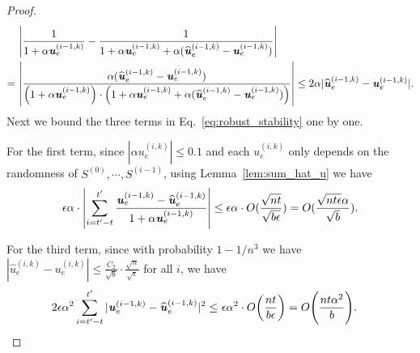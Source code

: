 \documentclass[11pt]{article}
\let\originalleft\left
\let\originalright\right
\renewcommand{\left}{\mathopen{}\mathclose\bgroup\originalleft}
\renewcommand{\right}{\aftergroup\egroup\originalright}
\newcommand\uu{\boldsymbol{\mathit{u}}}
\renewcommand\SS{\boldsymbol{\mathit{S}}}
\newcommand{\wh}{\widehat}
\begin{document}
\begin{proof}
\begin{align*}
&~ \left|\frac{1}{1 + \alpha \uu_e^{(i-1,k)}} - \frac{1}{{1 + \alpha \uu_e^{(i-1,k)} + \alpha (\wh{\uu}_e^{(i-1,k)} - \uu_e^{(i-1,k)})}}\right| \\
= &~ \left|\frac{\alpha (\wh{\uu}_e^{(i-1,k)} - \uu_e^{(i-1,k)})}{\left(1 + \alpha \uu_e^{(i-1,k)}\right) \cdot \left(1 + \alpha \uu_e^{(i-1,k)} + \alpha (\wh{\uu}_e^{(i-1,k)} - \uu_e^{(i-1,k)}) \right)}\right| 
\leq  2 \alpha |\wh{\uu}_e^{(i-1,k)} - \uu_e^{(i-1,k)}|.
\end{align*}
Next we bound the three terms in Eq.~\eqref{eq:robust_stability} one by one.

For the first term, since $|\alpha \uu_e^{(i,k)}| \leq 0.1$ and each $\uu_e^{(i,k)}$ only depends on the randomness of $\SS^{(0)}, \cdots, \SS^{(i-1)}$, using Lemma~\ref{lem:sum_hat_u} we have
\begin{align}\label{eq:robust_stability_1}
\epsilon \alpha \cdot \left|\sum_{i = t'-t}^{t'} \frac{\uu_e^{(i-1,k)} - \wh{\uu}_e^{(i-1,k)}}{1 + \alpha \uu_e^{(i-1,k)}}\right| \leq \epsilon \alpha \cdot O( \frac{\sqrt{n t}}{\sqrt{b \epsilon}}) = O( \frac{\sqrt{n t \epsilon} \alpha}{\sqrt{b}}). 
\end{align}

For the third term, since with probability $1-1/n^3$ we have $|\wh{\uu}^{(i,k)}_e - \uu^{(i,k)}_e| \leq \frac{C_2}{\sqrt{b}} \cdot \frac{\sqrt{n}}{\sqrt{\epsilon}}$ for all $i$, we have
\begin{align}\label{eq:robust_stability_3}
2 \epsilon \alpha^2 \sum_{i = t'-t}^{t'} | \uu_e^{(i-1,k)} - \wh{\uu}_e^{(i-1,k)}|^2 \leq &~ \epsilon \alpha^2 \cdot O\left(\frac{n t}{b \epsilon}\right) = O\left(\frac{n t \alpha^2}{b}\right).
\end{align}



\end{proof}
\end{document}
